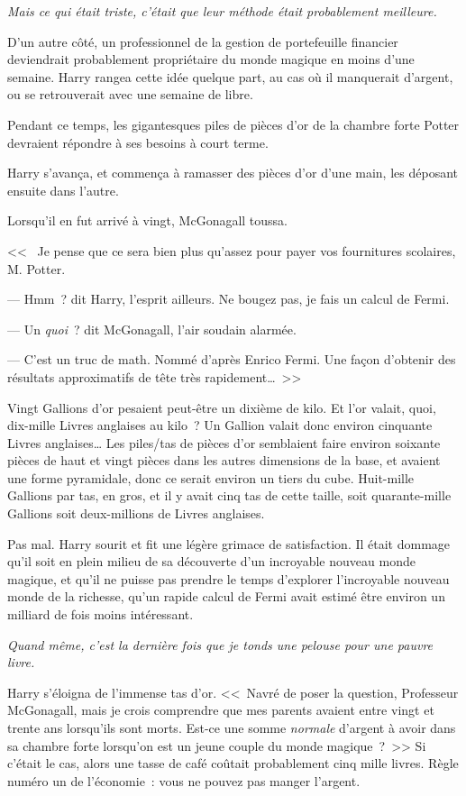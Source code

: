 \emph{Mais ce qui était triste, c'était que leur méthode était probablement meilleure.}

D'un autre côté, un professionnel de la gestion de portefeuille financier deviendrait probablement propriétaire du monde magique en moins d'une semaine. Harry rangea cette idée quelque part, au cas où il manquerait d'argent, ou se retrouverait avec une semaine de libre.

Pendant ce temps, les gigantesques piles de pièces d'or de la chambre forte Potter devraient répondre à ses besoins à court terme.

Harry s'avança, et commença à ramasser des pièces d'or d'une main, les déposant ensuite dans l'autre.

Lorsqu'il en fut arrivé à vingt, McGonagall toussa.

<<~ Je pense que ce sera bien plus qu'assez pour payer vos fournitures scolaires, M. Potter.

--- Hmm~? dit Harry, l'esprit ailleurs. Ne bougez pas, je fais un calcul de Fermi.

--- Un \emph{quoi}~? dit McGonagall, l'air soudain alarmée.

--- C'est un truc de math. Nommé d'après Enrico Fermi. Une façon d'obtenir des résultats approximatifs de tête très rapidement…~>>

Vingt Gallions d'or pesaient peut-être un dixième de kilo. Et l'or valait, quoi, dix-mille Livres anglaises au kilo~? Un Gallion valait donc environ cinquante Livres anglaises… Les piles/tas de pièces d'or semblaient faire environ soixante pièces de haut et vingt pièces dans les autres dimensions de la base, et avaient une forme pyramidale, donc ce serait environ un tiers du cube. Huit-mille Gallions par tas, en gros, et il y avait cinq tas de cette taille, soit quarante-mille Gallions soit deux-millions de Livres anglaises.

Pas mal. Harry sourit et fit une légère grimace de satisfaction. Il était dommage qu'il soit en plein milieu de sa découverte d'un incroyable nouveau monde magique, et qu'il ne puisse pas prendre le temps d'explorer l'incroyable nouveau monde de la richesse, qu'un rapide calcul de Fermi avait estimé être environ un milliard de fois moins intéressant.

\emph{Quand même, c'est la dernière fois que je tonds une pelouse pour une pauvre livre.}

Harry s'éloigna de l'immense tas d'or. <<~Navré de poser la question, Professeur McGonagall, mais je crois comprendre que mes parents avaient entre vingt et trente ans lorsqu'ils sont morts. Est-ce une somme \emph{normale} d'argent à avoir dans sa chambre forte lorsqu'on est un jeune couple du monde magique~?~>> Si c'était le cas, alors une tasse de café coûtait probablement cinq mille livres. Règle numéro un de l'économie~: vous ne pouvez pas manger l'argent.

